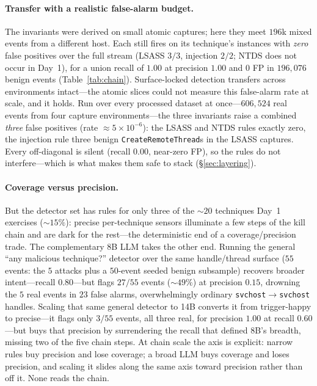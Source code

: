 \documentclass[sigconf,nonacm]{acmart}
\begin{document}
\paragraph{Transfer with a realistic false-alarm budget.}
The invariants were derived on small atomic captures; here they meet $196$k
mixed events from a different host. Each still fires on its technique's instances
with \emph{zero} false positives over the full stream (LSASS $3/3$, injection
$2/2$; NTDS does not occur in Day~1), for a union recall of $1.00$ at precision
$1.00$ and $0$ FP in $196{,}076$ benign events (Table~\ref{tab:chain}).
Surface-locked detection transfers across environments intact---the atomic
slices could not measure this false-alarm rate at scale, and it holds. Run over
every processed dataset at once---$606{,}524$ real events from four capture
environments---the three invariants raise a combined \emph{three} false
positives (rate $\approx 5\times10^{-6}$): the LSASS and NTDS rules exactly zero,
the injection rule three benign \texttt{CreateRemoteThread}s in the LSASS
captures. Every off-diagonal is silent (recall $0.00$, near-zero FP), so the
rules do not interfere---which is what makes them safe to stack
(\S\ref{sec:layering}).

\paragraph{Coverage versus precision.}
But the detector set has rules for only three of the $\sim\!20$ techniques Day~1
exercises ($\sim\!15\%$): precise per-technique sensors illuminate a few steps of
the kill chain and are dark for the rest---the deterministic end of a
coverage/precision trade. The complementary 8B LLM takes the other end. Running
the general ``any malicious technique?'' detector over the same handle/thread
surface ($55$ events: the $5$ attacks plus a $50$-event seeded benign subsample)
recovers broader intent---recall $0.80$---but flags $27/55$ events
($\sim\!49\%$) at precision $0.15$, drowning the $5$ real events in $23$ false
alarms, overwhelmingly ordinary \texttt{svchost}$\rightarrow$\texttt{svchost}
handles. Scaling that same general detector to 14B converts it from
trigger-happy to precise---it flags only $3/55$ events, all three real, for
precision $1.00$ at recall $0.60$---but buys that precision by surrendering the
recall that defined 8B's breadth, missing two of the five chain steps. At chain
scale the axis is explicit: narrow rules buy precision and lose coverage; a broad
LLM buys coverage and loses precision, and scaling it slides along the same axis
toward precision rather than off it. None reads the chain.
\end{document}
